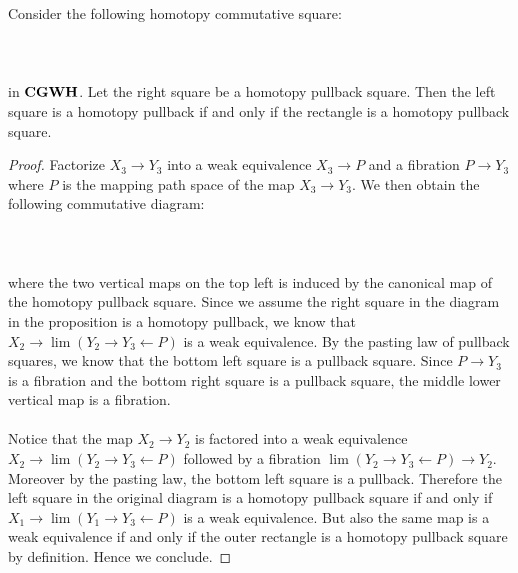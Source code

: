 \documentclass[a4paper]{article}
\begin{document}
\begin{prp}{}{} Consider the following homotopy commutative square: \\~\\
\\~\\
in $\bold{CGWH}$. Let the right square be a homotopy pullback square. Then the left square is a homotopy pullback if and only if the rectangle is a homotopy pullback square. \tcbline
\begin{proof}
Factorize $X_3\to Y_3$ into a weak equivalence $X_3\to P$ and a fibration $P\to Y_3$ where $P$ is the mapping path space of the map $X_3\to Y_3$. We then obtain the following commutative diagram: \\~\\
\\~\\
where the two vertical maps on the top left is induced by the canonical map of the homotopy pullback square. Since we assume the right square in the diagram in the proposition is a homotopy pullback, we know that $X_2\to\lim(Y_2\rightarrow Y_3\leftarrow P)$ is a weak equivalence. By the pasting law of pullback squares, we know that the bottom left square is a pullback square. Since $P\to Y_3$ is a fibration and the bottom right square is a pullback square, the middle lower vertical map is a fibration. \\~\\

Notice that the map $X_2\to Y_2$ is factored into a weak equivalence $X_2\to\lim(Y_2\rightarrow Y_3\leftarrow P)$ followed by a fibration $\lim(Y_2\rightarrow Y_3\leftarrow P)\to Y_2$. Moreover by the pasting law, the bottom left square is a pullback. Therefore the left square in the original diagram is a homotopy pullback square if and only if $X_1\to\lim(Y_1\rightarrow Y_3\leftarrow P)$ is a weak equivalence. But also the same map is a weak equivalence if and only if the outer rectangle is a homotopy pullback square by definition. Hence we conclude. 
\end{proof}
\end{prp}
\end{document}
